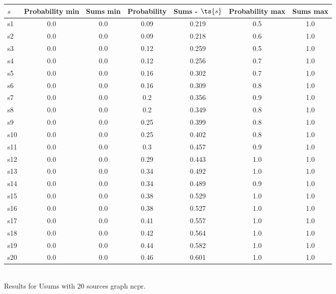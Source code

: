 \documentclass{article}
\begin{document}
\noindent\begin{tabular}{|l|c|c|c|c|c|c|}
\hline
$s$& Probability min & Sums min & Probability & Sums - $\ts{s}$ & Probability max & Sums max\\
\hline
s1 &0.0 & 0.0 & 0.09 & 0.219 & 0.5 & 1.0\\
\hline
s2 &0.0 & 0.0 & 0.09 & 0.218 & 0.6 & 1.0\\
\hline
s3 &0.0 & 0.0 & 0.12 & 0.259 & 0.5 & 1.0\\
\hline
s4 &0.0 & 0.0 & 0.12 & 0.256 & 0.7 & 1.0\\
\hline
s5 &0.0 & 0.0 & 0.16 & 0.302 & 0.7 & 1.0\\
\hline
s6 &0.0 & 0.0 & 0.16 & 0.309 & 0.8 & 1.0\\
\hline
s7 &0.0 & 0.0 & 0.2 & 0.356 & 0.9 & 1.0\\
\hline
s8 &0.0 & 0.0 & 0.2 & 0.349 & 0.8 & 1.0\\
\hline
s9 &0.0 & 0.0 & 0.25 & 0.399 & 0.8 & 1.0\\
\hline
s10 &0.0 & 0.0 & 0.25 & 0.402 & 0.8 & 1.0\\
\hline
s11 &0.0 & 0.0 & 0.3 & 0.457 & 0.9 & 1.0\\
\hline
s12 &0.0 & 0.0 & 0.29 & 0.443 & 1.0 & 1.0\\
\hline
s13 &0.0 & 0.0 & 0.34 & 0.492 & 1.0 & 1.0\\
\hline
s14 &0.0 & 0.0 & 0.34 & 0.489 & 0.9 & 1.0\\
\hline
s15 &0.0 & 0.0 & 0.38 & 0.529 & 1.0 & 1.0\\
\hline
s16 &0.0 & 0.0 & 0.38 & 0.527 & 1.0 & 1.0\\
\hline
s17 &0.0 & 0.0 & 0.41 & 0.557 & 1.0 & 1.0\\
\hline
s18 &0.0 & 0.0 & 0.42 & 0.564 & 1.0 & 1.0\\
\hline
s19 &0.0 & 0.0 & 0.44 & 0.582 & 1.0 & 1.0\\
\hline
s20 &0.0 & 0.0 & 0.46 & 0.601 & 1.0 & 1.0\\
\hline
\end{tabular}\\

\noindent Results for Usums with 20 sources graph ncpr.
\end{document}
